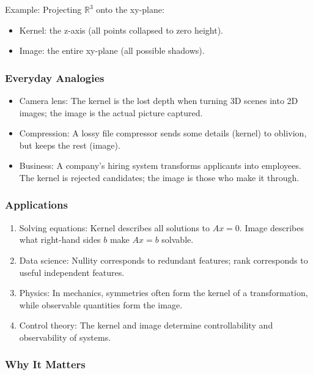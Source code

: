 \documentclass[
  letterpaper,
  DIV=11,
  numbers=noendperiod]{scrreprt}
\providecommand{\tightlist}{%
  \setlength{\itemsep}{0pt}\setlength{\parskip}{0pt}}
\begin{document}
Example: Projecting \(\mathbb{R}^3\) onto the xy-plane:

\begin{itemize}
\tightlist
\item
  Kernel: the z-axis (all points collapsed to zero height).
\item
  Image: the entire xy-plane (all possible shadows).
\end{itemize}

\subsubsection{Everyday Analogies}\label{everyday-analogies-39}

\begin{itemize}
\tightlist
\item
  Camera lens: The kernel is the lost depth when turning 3D scenes into
  2D images; the image is the actual picture captured.
\item
  Compression: A lossy file compressor sends some details (kernel) to
  oblivion, but keeps the rest (image).
\item
  Business: A company's hiring system transforms applicants into
  employees. The kernel is rejected candidates; the image is those who
  make it through.
\end{itemize}

\subsubsection{Applications}\label{applications-6}

\begin{enumerate}
\def\labelenumi{\arabic{enumi}.}
\tightlist
\item
  Solving equations: Kernel describes all solutions to \(Ax=0\). Image
  describes what right-hand sides \(b\) make \(Ax=b\) solvable.
\item
  Data science: Nullity corresponds to redundant features; rank
  corresponds to useful independent features.
\item
  Physics: In mechanics, symmetries often form the kernel of a
  transformation, while observable quantities form the image.
\item
  Control theory: The kernel and image determine controllability and
  observability of systems.
\end{enumerate}

\subsubsection{Why It Matters}\label{why-it-matters-39}
\end{document}
